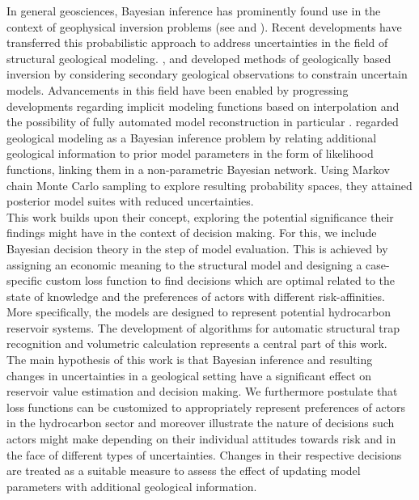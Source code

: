 In general geosciences, Bayesian inference has prominently found use in the context of geophysical inversion problems (see \citet{tarantola1982inverse, mosegaard2002probabilistic} and \citet{sambridge2002monte}). Recent developments have transferred this probabilistic approach to address uncertainties in the field of structural geological modeling. \citet{Caumon2010}, \citet{jessell2010towards} and \citet{wellmann2010towards} developed methods of geologically based inversion by considering secondary geological observations to constrain uncertain models.  Advancements in this field have been enabled by progressing developments regarding implicit modeling functions based on interpolation and the possibility of fully automated model reconstruction in particular \citep{hillier2014three, mallet1992discrete, lajaunie1997foliation}. \citet{delaVarga2016} regarded geological modeling as a Bayesian inference problem by relating additional geological information to prior model parameters in the form of likelihood functions, linking them in a non-parametric Bayesian network. Using Markov chain Monte Carlo sampling to explore resulting probability spaces, they attained posterior model suites with reduced uncertainties.\\
This work builds upon their concept, exploring the potential significance their findings might have in the context of decision making. For this, we include Bayesian decision theory in the step of model evaluation. This is achieved by assigning an economic meaning to the structural model and designing a case-specific custom loss function to find decisions which are optimal related to the state of knowledge and the preferences of actors with different risk-affinities. More specifically, the models are designed to represent potential hydrocarbon reservoir systems. The development of algorithms for automatic structural trap recognition and volumetric calculation represents a central part of this work.\\
The main hypothesis of this work is that Bayesian inference and resulting changes in uncertainties in a geological setting have a significant effect on reservoir value estimation and decision making. We furthermore postulate that loss functions can be customized to appropriately represent preferences of actors in the hydrocarbon sector and moreover illustrate the nature of decisions such actors might make depending on their individual attitudes towards risk and in the face of different types of uncertainties. Changes in their respective decisions are treated as a suitable measure to assess the effect of updating model parameters with additional geological information.